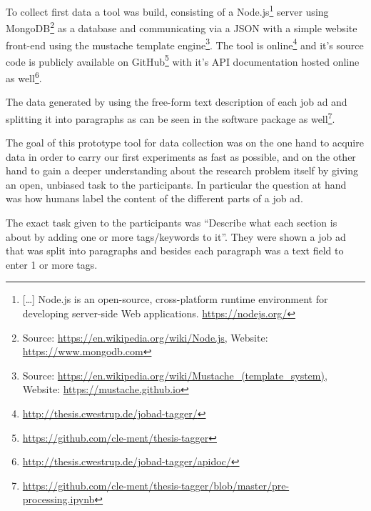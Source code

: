 
To collect first data a tool was build, consisting of a Node.js\footnote{[\ldots] Node.js is an open-source, cross-platform runtime environment for developing server-side Web applications. \url{https://nodejs.org/}} server using MongoDB\footnote{ Source: \url{https://en.wikipedia.org/wiki/Node.js}, Website: \url{https://www.mongodb.com}} as a database and communicating via a JSON with a simple website front-end using the mustache template engine\footnote{ Source: \url{https://en.wikipedia.org/wiki/Mustache_(template_system)}, Website: \url{https://mustache.github.io}}.
The tool is online\footnote{\url{http://thesis.cwestrup.de/jobad-tagger/}} and it's source code is publicly available on GitHub\footnote{\url{https://github.com/cle-ment/thesis-tagger}} with it's API documentation hosted online as well\footnote{\url{http://thesis.cwestrup.de/jobad-tagger/apidoc/}}.

The data generated by using the free-form text description of each job ad and splitting it into paragraphs as can be seen in the software package as well\footnote{\url{https://github.com/cle-ment/thesis-tagger/blob/master/pre-processing.ipynb}}.

The goal of this prototype tool for data collection was on the one hand to acquire data in order to carry our first experiments as fast as possible, and on the other hand to gain a deeper understanding about the research problem itself by giving an open, unbiased task to the participants. In particular the question at hand was how humans label the content of the different parts of a job ad.

The exact task given to the participants was ``Describe what each section is about by adding one or more tags/keywords to it''. They were shown a job ad that was split into paragraphs and besides each paragraph was a text field to enter 1 or more tags.

